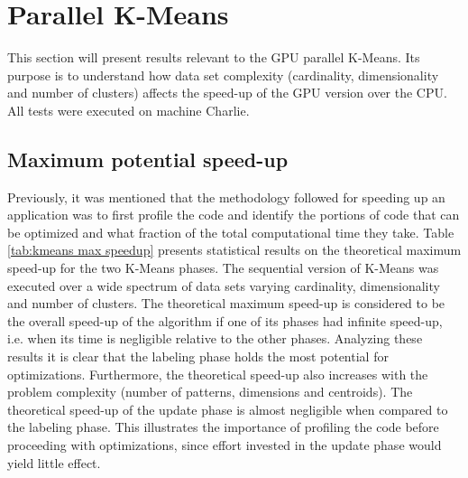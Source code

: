 \section{Parallel K-Means}
\label{sec:parallel kmeans}

This section will present results relevant to the GPU parallel K-Means.
Its purpose is to understand how data set complexity (cardinality, dimensionality and number of clusters) affects the speed-up of the GPU version over the CPU.
All tests were executed on machine Charlie.

\subsection{Maximum potential speed-up}

Previously, it was mentioned that the methodology followed for speeding up an application was to first profile the code and identify the portions of code that can be optimized and what fraction of the total computational time they take.
Table \ref{tab:kmeans max speedup} presents statistical results on the theoretical maximum speed-up for the two K-Means phases.
The sequential version of K-Means was executed over a wide spectrum of data sets varying cardinality, dimensionality and number of clusters.
The theoretical maximum speed-up is considered to be the overall speed-up of the algorithm if one of its phases had infinite speed-up, i.e. when its time is negligible relative to the other phases.
Analyzing these results it is clear that the labeling phase holds the most potential for optimizations.
Furthermore, the theoretical speed-up also increases with the problem complexity (number of patterns, dimensions and centroids).
The theoretical speed-up of the update phase is almost negligible when compared to the labeling phase.
This illustrates the importance of profiling the code before proceeding with optimizations, since effort invested in the update phase would yield little effect.

